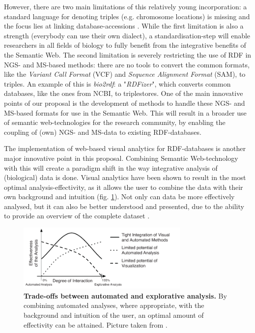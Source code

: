 \documentclass[twoside,fontsize=10pt]{article}
\begin{document}
However, there are two main limitations of this relatively young incorporation: a standard language for denoting triples (e.g. chromosome locations) is missing and the focus lies at linking database-accessions \citep{Ruttenberg2007}. While the first limitation is also a strength (everybody can use their own dialect), a standardisation-step will enable researchers in all fields of biology to fully benefit from the integrative benefits of the Semantic Web. The second limitation is  severely restricting the use of RDF in NGS- and MS-based methods: there are no tools to convert the common formats, like the \textit{Variant Call Format} (VCF) and \textit{Sequence Alignment Format} (SAM), to triples. An example of this is  \textit{bio2rdf}\cite{Belleau2008}: a "\textit{RDFizer}", which converts common databases, like the ones from NCBI, to triplestores. One of the main innovative points of our proposal is the development of methods to handle these NGS- and MS-based formats for use in the Semantic Web. This will result in a broader use of semantic web-technologies for the research community, by enabling the coupling of (own) NGS- and MS-data to existing RDF-databases.
\medskip

\noindent
The implementation of web-based visual analytics for RDF-databases is another major innovative point in this proposal. Combining Semantic Web-technology with this will create a paradigm shift in the way integrative analysis of (biological) data is done. Visual analytics have been shown to result in the most optimal analysis-effectivity, as it allows the user to combine the data with their own background and intuition (fig. \ref{fig:ae}). Not only can data be more effectively analysed, but it can also be better understood and presented, due to the ability to provide an overview of the complete dataset \cite{Thomas2005, Keim}. 

\begin{figure}[H]
    \centering
    \includegraphics[width=0.75\textwidth]{autoVSexplo}
    \caption{\textbf{Trade-offs between automated and explorative analysis.} By combining automated analyses, where appropriate, with the background and intuition of the user, an optimal amount of effectivity can be attained. Picture taken from \citet{Keim}.}
    \label{fig:ae}
\end{figure}
\medskip
\end{document}
